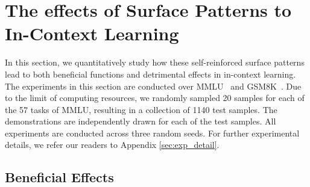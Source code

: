 \documentclass{article} %
\def\jin#1{{\color{blue}{\bf [Xujin:} {{#1}}{\bf ]}}}
\begin{document}
\section{The effects of Surface Patterns to In-Context Learning}
\label{sec:real_world}
In this section, we quantitatively study how these self-reinforced surface patterns lead to both beneficial functions and detrimental effects in in-context learning.
The experiments in this section are conducted over MMLU~\citep{hendrycks2021measuring} and GSM8K~\citep{cobbe2021training}. 
Due to the limit of computing resources, we randomly sampled 20 samples for each of the 57 tasks of MMLU, resulting in a collection of 1140 test samples. 
The demonstrations are independently drawn for each of the test samples. All experiments are conducted across three random seeds. For further experimental details, we refer our readers to Appendix \ref{sec:exp_detail}.

\subsection{Beneficial Effects}
\end{document}
